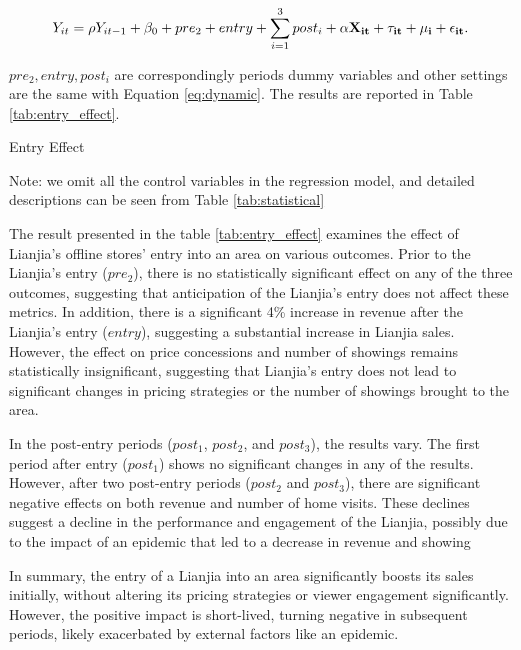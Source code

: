 \documentclass[12pt]{article}
\begin{document}
\begin{equation}
    Y_{it} = \rho Y_{it-1} + \beta_0 +  pre_2 + entry + \sum_{i=1}^3 post_i + \bf{\alpha} \bf{X}_{it} + \tau_{it} + \mu_i + \epsilon_{it}.   \label{eq:entry_effect}
\end{equation}

$pre_2, entry, post_i$ are correspondingly periods dummy variables and other settings are the same with Equation \eqref{eq:dynamic}. The results are reported in Table \ref{tab:entry_effect}.

\begin{table}[htb!]
  \begin{center}
    \begin{scriptsize}
    \caption{Entry Effect}
    \label{tab:entry_effect}
      
    
    Note: we omit all the control variables in the regression model, and detailed descriptions can be seen from Table \ref{tab:statistical}
    \end{scriptsize}
  \end{center}
\end{table}

The result presented in the table \ref{tab:entry_effect} examines the effect of Lianjia's offline stores' entry into an area on various outcomes. Prior to the Lianjia's entry ($pre_2$), there is no statistically significant effect on any of the three outcomes, suggesting that anticipation of the Lianjia's entry does not affect these metrics. In addition, there is a significant 4\% increase in revenue after the Lianjia's entry ($entry$), suggesting a substantial increase in Lianjia sales. However, the effect on price concessions and number of showings remains statistically insignificant, suggesting that Lianjia's entry does not lead to significant changes in pricing strategies or the number of showings brought to the area.

In the post-entry periods ($post_1$, $post_2$, and $post_3$), the results vary. The first period after entry ($post_1$) shows no significant changes in any of the results. However, after two post-entry periods ($post_2$ and $post_3$), there are significant negative effects on both revenue and number of home visits. These declines suggest a decline in the performance and engagement of the Lianjia, possibly due to the impact of an epidemic that led to a decrease in revenue and showing

In summary, the entry of a Lianjia into an area significantly boosts its sales initially, without altering its pricing strategies or viewer engagement significantly. However, the positive impact is short-lived, turning negative in subsequent periods, likely exacerbated by external factors like an epidemic.
\end{document}

